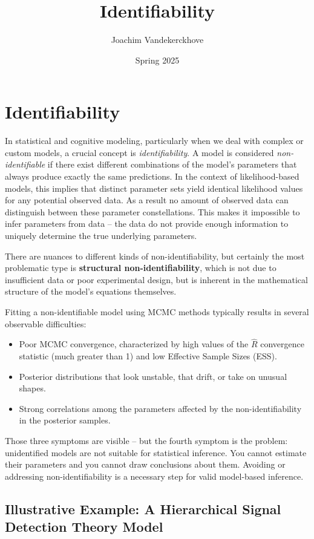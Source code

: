 \documentclass[12pt]{article}
\title{Identifiability}
\author{Joachim Vandekerckhove}
\date{Spring 2025}
\begin{document}
\section*{Identifiability}

In statistical and cognitive modeling, particularly when we deal with complex or custom models, a crucial concept is \emph{identifiability}. A model is considered \emph{non-identifiable} if there exist different combinations of the model's parameters that always produce exactly the same predictions. In the context of likelihood-based models, this implies that distinct parameter sets yield identical likelihood values for any potential observed data.  As a result no amount of observed data can distinguish between these parameter constellations. This makes it impossible to infer parameters from data -- the data do not provide enough information to uniquely determine the true underlying parameters.

There are nuances to different kinds of non-identifiability, but certainly the most problematic type is \textbf{structural non-identifiability}, which is not due to insufficient data or poor experimental design, but is inherent in the mathematical structure of the model's equations themselves.

Fitting a non-identifiable model using MCMC methods typically results in several observable difficulties:
\begin{itemize}
    \item Poor MCMC convergence, characterized by high values of the $\hat{R}$ convergence statistic (much greater than 1) and low Effective Sample Sizes (ESS).
    \item Posterior distributions that look unstable, that drift, or take on unusual shapes.
    \item Strong correlations among the parameters affected by the non-identifiability in the posterior samples.
\end{itemize}

Those three symptoms are visible -- but the fourth symptom is the problem: unidentified models are not suitable for statistical inference.  You cannot estimate their parameters and you cannot draw conclusions about them.  Avoiding or addressing non-identifiability is a necessary step for valid model-based inference.


\subsection*{Illustrative Example: A Hierarchical Signal Detection Theory Model}
\end{document}

